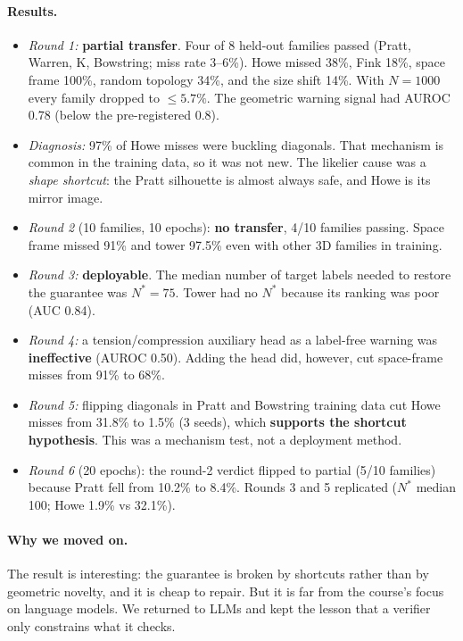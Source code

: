 \paragraph{Results.}
\begin{itemize}\itemsep0pt
\item \emph{Round 1:} \textbf{partial transfer}. Four of 8 held-out families passed (Pratt, Warren, K, Bowstring; miss rate 3--6\%). Howe missed 38\%, Fink 18\%, space frame 100\%, random topology 34\%, and the size shift 14\%. With $N{=}1000$ every family dropped to $\leq 5.7\%$. The geometric warning signal had AUROC 0.78 (below the pre-registered 0.8).
\item \emph{Diagnosis:} 97\% of Howe misses were buckling diagonals. That mechanism is common in the training data, so it was not new. The likelier cause was a \emph{shape shortcut}: the Pratt silhouette is almost always safe, and Howe is its mirror image.
\item \emph{Round 2} (10 families, 10 epochs): \textbf{no transfer}, 4/10 families passing. Space frame missed 91\% and tower 97.5\% even with other 3D families in training.
\item \emph{Round 3:} \textbf{deployable}. The median number of target labels needed to restore the guarantee was $N^\ast{=}75$. Tower had no $N^\ast$ because its ranking was poor (AUC 0.84).
\item \emph{Round 4:} a tension/compression auxiliary head as a label-free warning was \textbf{ineffective} (AUROC 0.50). Adding the head did, however, cut space-frame misses from 91\% to 68\%.
\item \emph{Round 5:} flipping diagonals in Pratt and Bowstring training data cut Howe misses from 31.8\% to 1.5\% (3 seeds), which \textbf{supports the shortcut hypothesis}. This was a mechanism test, not a deployment method.
\item \emph{Round 6} (20 epochs): the round-2 verdict flipped to partial (5/10 families) because Pratt fell from 10.2\% to 8.4\%. Rounds 3 and 5 replicated ($N^\ast$ median 100; Howe 1.9\% vs 32.1\%).
\end{itemize}

\paragraph{Why we moved on.} The result is interesting: the guarantee is broken by shortcuts rather than by geometric novelty, and it is cheap to repair. But it is far from the course's focus on language models. We returned to LLMs and kept the lesson that a verifier only constrains what it checks.

